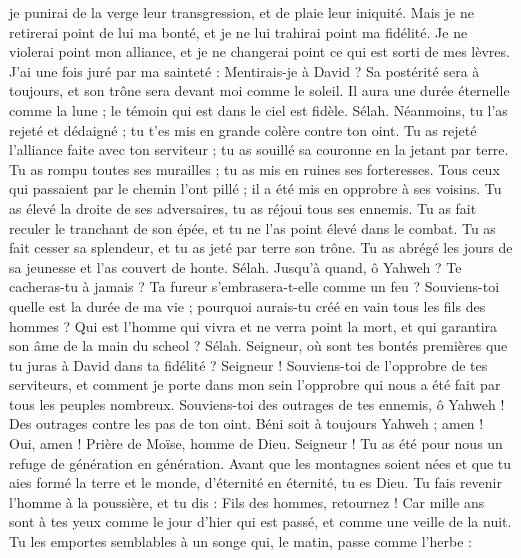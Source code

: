 \begin{multicols}{2}
je punirai de la verge leur transgression, et de plaie leur iniquité.
Mais je ne retirerai point de lui ma bonté, et je ne lui trahirai point ma fidélité.
Je ne violerai point mon alliance, et je ne changerai point ce qui est sorti de mes lèvres.
J'ai une fois juré par ma sainteté : Mentirais-je à David ?
Sa postérité sera à toujours, et son trône sera devant moi comme le soleil.
Il aura une durée éternelle comme la lune ; le témoin qui est dans le ciel est fidèle. Sélah.
Néanmoins, tu l'as rejeté et dédaigné ; tu t'es mis en grande colère contre ton oint.
Tu as rejeté l'alliance faite avec ton serviteur ; tu as souillé sa couronne en la jetant par terre.
Tu as rompu toutes ses murailles ; tu as mis en ruines ses forteresses.
Tous ceux qui passaient par le chemin l'ont pillé ; il a été mis en opprobre à ses voisins.
Tu as élevé la droite de ses adversaires, tu as réjoui tous ses ennemis.
Tu as fait reculer le tranchant de son épée, et tu ne l'as point élevé dans le combat.
Tu as fait cesser sa splendeur, et tu as jeté par terre son trône.
Tu as abrégé les jours de sa jeunesse et l'as couvert de honte. Sélah.
Jusqu'à quand, ô Yahweh ? Te cacheras-tu à jamais ? Ta fureur s'embrasera-t-elle comme un feu ?
Souviens-toi quelle est la durée de ma vie ; pourquoi aurais-tu créé en vain tous les fils des hommes ?
Qui est l'homme qui vivra et ne verra point la mort, et qui garantira son âme de la main du scheol ? Sélah.
Seigneur, où sont tes bontés premières que tu juras à David dans ta fidélité ?
Seigneur ! Souviens-toi de l'opprobre de tes serviteurs, et comment je porte dans mon sein l'opprobre qui nous a été fait par tous les peuples nombreux.
Souviens-toi des outrages de tes ennemis, ô Yahweh ! Des outrages contre les pas de ton oint.
Béni soit à toujours Yahweh ; amen ! Oui, amen !
\VerseOne{}Prière de Moïse, homme de Dieu. Seigneur ! Tu as été pour nous un refuge de génération en génération.
Avant que les montagnes soient nées et que tu aies formé la terre et le monde, d'éternité en éternité, tu es Dieu.
Tu fais revenir l'homme à la poussière, et tu dis : Fils des hommes, retournez !
Car mille ans sont à tes yeux comme le jour d'hier qui est passé, et comme une veille de la nuit.
Tu les emportes semblables à un songe qui, le matin, passe comme l'herbe :

\end{multicols}
